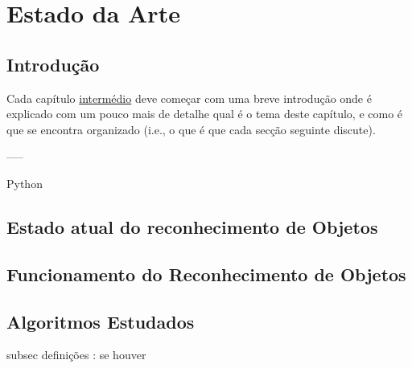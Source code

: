 \chapter{Estado da Arte}
\label{chap:estado-da-arte}

\section{Introdução}
\label{chap2:sec:intro}
Cada capítulo \underline{intermédio} deve começar com uma breve introdução onde é explicado com um pouco mais de detalhe qual é o tema deste capítulo, e como é que se encontra organizado (i.e., o que é que cada secção seguinte discute). 



-----

Python

\section{Estado atual do reconhecimento de Objetos}
\label{chap2:sec:estado}





\section{Funcionamento do Reconhecimento de Objetos}
\label{chap2:sec:funcionamento}



\section{Algoritmos Estudados}
\label{chap2:sec:algoritmos}

subsec definições : se houver

